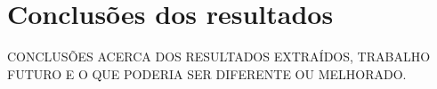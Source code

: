 \chapter{Conclusões dos resultados}
\label{cha:conclusao_resultados}
CONCLUSÕES ACERCA DOS RESULTADOS EXTRAÍDOS, TRABALHO FUTURO E O QUE PODERIA SER DIFERENTE OU MELHORADO.
